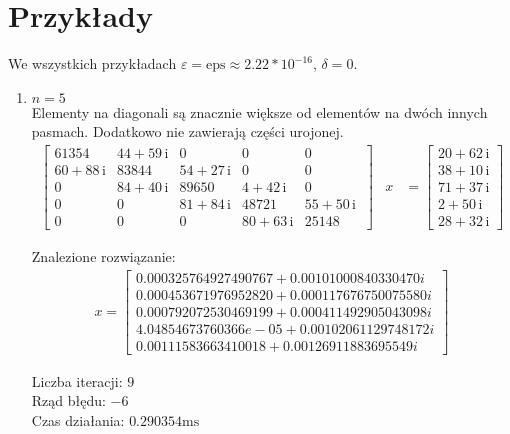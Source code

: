 \documentclass[12pt]{article}
\begin{document}
	\section{Przykłady}
	We wszystkich przykładach $\varepsilon = \text{eps} \approx 2.22 * 10^{-16}$, $\delta = 0$.
	\begin{enumerate}[label=\textbf{Układ \arabic*}]
		\item
			$n = 5$ \\
			Elementy na diagonali są znacznie większe od elementów na dwóch innych pasmach. Dodatkowo nie zawierają części urojonej.
			\begin{align*}
				\left[
					\begin{array}{ccccc} 61354 & 44 + 59\, \mathrm{i} & 0 & 0 & 0\\ 60 + 88\, \mathrm{i} & 83844 & 54 + 27\, \mathrm{i} & 0 & 0\\ 0 & 84 + 40\, \mathrm{i} & 89650 & 4 + 42\, \mathrm{i} & 0\\ 0 & 0 & 81 + 84\, \mathrm{i} & 48721 & 55 + 50\, \mathrm{i}\\ 0 & 0 & 0 & 80 + 63\, \mathrm{i} & 25148 \end{array}\
				\right]
				&x
				&= 
				\left[
					\begin{array}{c} 20 + 62\, \mathrm{i}\\ 38 + 10\, \mathrm{i}\\ 71 + 37\, \mathrm{i}\\ 2 + 50\, \mathrm{i}\\ 28 + 32\, \mathrm{i} \end{array}
				\right]	
			\end{align*}
			
			Znalezione rozwiązanie:
			\begin{align*}
			x = 
				\left[
					\begin{array}{c}
					0.000325764927490767 + 0.00101000840330470i\\
					0.000453671976952820 + 0.000117676750075580i\\
					0.000792072530469199 + 0.000411492905043098i\\
					4.04854673760366e-05 + 0.00102061129748172i\\
					0.00111583663410018 + 0.00126911883695549i
					\end{array}
				\right]
			\end{align*}
			
			Liczba iteracji: $9$\\
			Rząd błędu: $-6$\\
			Czas działania: $0.290354\text{ms}$
		

\end{enumerate}
\end{document}
